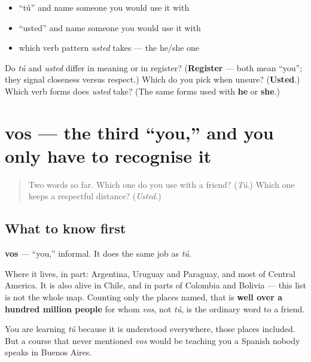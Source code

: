 \begin{itemize}
\raggedright
  \item \textquotedblleft{}tú\textquotedblright{} and name someone you would use it with
  \item \textquotedblleft{}usted\textquotedblright{} and name someone you would use it with
  \item which verb pattern \emph{usted} takes — the he/she one
\end{itemize}

\begin{tcolorbox}[breakable,colback=teal!4,colframe=teal!35!black,title={Before you move on}]
Do \emph{tú} and \emph{usted} differ in meaning or in register? (\textbf{Register} — both mean \textquotedblleft{}you\textquotedblright{}; they signal closeness versus respect.) Which do you pick when unsure? (\textbf{Usted}.) Which verb forms does \emph{usted} take? (The same forms used with \textbf{he} or \textbf{she}.)
\end{tcolorbox}
\section[vos]{vos — the third \textquotedblleft{}you,\textquotedblright{} and you only have to recognise it}

\label{lesson:ES-C03-vos}



\begin{quote}
Two words so far. Which one do you use with a friend? (\emph{Tú}.) Which one keeps a respectful distance? (\emph{Usted}.)
\end{quote}

\subsection*{What to know first}
\textbf{vos} — \textquotedblleft{}you,\textquotedblright{} informal. It does the same job as \emph{tú}.

Where it lives, in part: Argentina, Uruguay and Paraguay, and most of Central America. It is also alive in Chile, and in parts of Colombia and Bolivia — this list is not the whole map. Counting only the places named, that is \textbf{well over a hundred million people} for whom \emph{vos}, not \emph{tú}, is the ordinary word to a friend.

You are learning \emph{tú} because it is understood everywhere, those places included. But a course that never mentioned \emph{vos} would be teaching you a Spanish nobody speaks in Buenos Aires.

